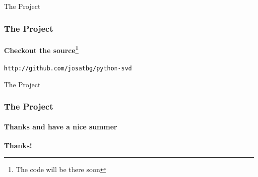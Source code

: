 \documentclass{beamer}
\begin{document}

\begin{frame}{The Project}

\frametitle{The Project}
\framesubtitle{Checkout the source\footnote{The code will be there soon}}

\begin{center}
\texttt{http://github.com/josatbg/python-svd}
\end{center}

\end{frame}


\begin{frame}{The Project}

\frametitle{The Project}
\framesubtitle{Thanks and have a nice summer}

\begin{center}
\textbf{Thanks!}
\end{center}

\end{frame}

\end{document}
